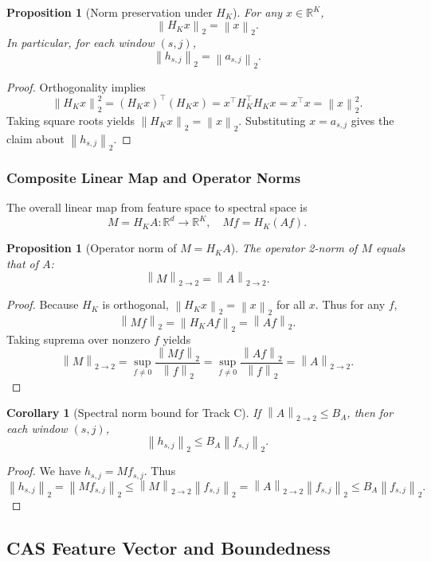 \documentclass[11pt]{article}
\newtheorem{proposition}[definition]{Proposition}
\newtheorem{corollary}[definition]{Corollary}
\newcommand{\R}{\mathbb{R}}
\newcommand{\norm}[1]{\left\lVert #1 \right\rVert}
\begin{document}
\begin{proposition}[Norm preservation under \(H_K\)]
For any \(x \in \R^K\),
\[
  \norm{H_K x}_2 = \norm{x}_2.
\]
In particular, for each window \((s,j)\),
\[
  \norm{h_{s,j}}_2 = \norm{a_{s,j}}_2.
\]
\end{proposition}

\begin{proof}
Orthogonality implies
\[
  \norm{H_K x}_2^2 = (H_K x)^\top (H_K x)
  = x^\top H_K^\top H_K x
  = x^\top x = \norm{x}_2^2.
\]
Taking square roots yields \(\norm{H_K x}_2 = \norm{x}_2\).
Substituting \(x = a_{s,j}\) gives the claim about \(\norm{h_{s,j}}_2\).
\end{proof}

\subsubsection{Composite Linear Map and Operator Norms}

The overall linear map from feature space to spectral space is
\[
  M = H_K A : \R^d \to \R^K, \quad M f = H_K (A f).
\]

\begin{proposition}[Operator norm of \(M = H_K A\)]
The operator 2-norm of \(M\) equals that of \(A\):
\[
  \norm{M}_{2\to2} = \norm{A}_{2\to2}.
\]
\end{proposition}

\begin{proof}
Because \(H_K\) is orthogonal, \(\norm{H_K x}_2 = \norm{x}_2\) for all \(x\).
Thus for any \(f\),
\[
  \norm{M f}_2 = \norm{H_K A f}_2 = \norm{A f}_2.
\]
Taking suprema over nonzero \(f\) yields
\[
  \norm{M}_{2\to2} = \sup_{f \ne 0} \frac{\norm{M f}_2}{\norm{f}_2}
  = \sup_{f \ne 0} \frac{\norm{A f}_2}{\norm{f}_2}
  = \norm{A}_{2\to2}.
\]
\end{proof}

\begin{corollary}[Spectral norm bound for Track C]
If \(\norm{A}_{2\to2} \le B_A\), then for each window \((s,j)\),
\[
  \norm{h_{s,j}}_2 \le B_A \norm{f_{s,j}}_2.
\]
\end{corollary}

\begin{proof}
We have \(h_{s,j} = M f_{s,j}\).
Thus
\[
  \norm{h_{s,j}}_2 = \norm{M f_{s,j}}_2 \le \norm{M}_{2\to2} \norm{f_{s,j}}_2 = \norm{A}_{2\to2} \norm{f_{s,j}}_2 \le B_A \norm{f_{s,j}}_2.
\]
\end{proof}

\subsection{CAS Feature Vector and Boundedness}
\end{document}
